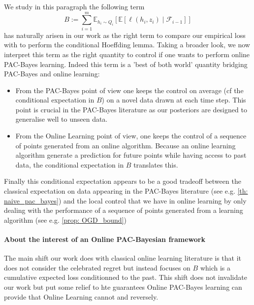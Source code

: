  We study in this paragraph the following term
  $$B:=\sum_{i=1}^m \mathbb{E}_{h_i\sim Q_{i}}\left[ \mathbb{E}[\ell(h_i,z_i) \mid \mathcal{F}_{i-1}]    \right]$$ has naturally arisen in our work as the right term to compare our empirical loss with to perform the conditional Hoeffding lemma.
 Taking a broader look, we now interpret this term as the right quantity to control if one wants to perform online PAC-Bayes learning. Indeed this term is a 'best of both world' quantity bridging PAC-Bayes and online learning:

 \begin{itemize}
   \item From the PAC-Bayes point of view one keeps the control on average (cf the conditional expectation in $B$) on a novel data drawn at each time step. This point is crucial in the PAC-Bayes literature as our posteriors are designed to generalise well to unseen data.
   \item From the Online Learning point of view, one keeps the control of a sequence of points generated from an online algorithm. Because an online learning algorithm generate a prediction for future points while having access to past data, the conditional expectation in $B$ translates this.
 \end{itemize}

Finally this conditional expectation appears to be a good tradeoff between the classical expectation on data appearing in the PAC-Bayes literature (see e.g. \cref{th: naive_pac_bayes}) and the local control that we have in online learning by only dealing with the performance of a sequence of points generated from a learning algorithm (see e.g. \cref{prop: OGD_bound})


\paragraph{About the interest of an Online PAC-Bayesian framework}
The main shift our work does with classical online learning literature is that it does not consider the celebrated regret but instead focuses on $B$ which is a cumulative expected loss conditionned to the past. This shift does not invalidate our work but put some relief to hte guarantees Online PAC-Bayes learning can provide that Online Learning cannot and reversely.

